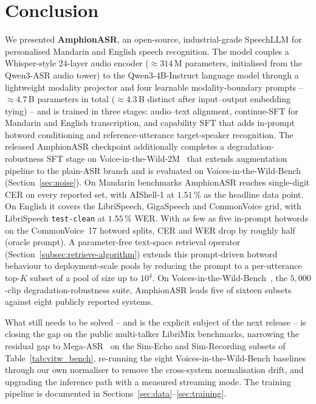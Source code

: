 \section{Conclusion}
\label{sec:conclusion}

We presented \textbf{AmphionASR}, an open-source, industrial-grade
SpeechLLM for personalised Mandarin and English speech recognition.
The model couples a Whisper-style 24-layer audio encoder
($\approx\!314$\,M parameters, initialised from the Qwen3-ASR audio
tower) to the Qwen3-4B-Instruct language model through a
lightweight modality projector and four learnable modality-boundary
prompts -- $\approx\!4.7$\,B parameters in total ($\approx\!4.3$\,B
distinct after input--output embedding tying) -- and is trained in
three stages: audio--text alignment, continue-SFT for Mandarin and
English transcription, and capability SFT that adds in-prompt
hotword conditioning and reference-utterance target-speaker
recognition. The released AmphionASR checkpoint additionally
completes a degradation-robustness SFT stage on Voice-in-the-Wild-2M~\cite{xie2026mega} that extends
augmentation pipeline to the plain-ASR branch and is evaluated on
Voices-in-the-Wild-Bench~\cite{xie2026mega}
(Section~\ref{sec:noise}). On Mandarin benchmarks AmphionASR
reaches single-digit CER on every reported set, with AIShell-1 at
$1.51$\,\% as the headline data point. On English it covers the
LibriSpeech, GigaSpeech and CommonVoice grid, with LibriSpeech
\texttt{test-clean} at $1.55$\,\% WER. With
as few as five in-prompt hotwords on the CommonVoice~17 hotword
splits, CER and WER drop by roughly half (oracle prompt).
A parameter-free text-space retrieval operator
(Section~\ref{subsec:retrieve-algorithm}) extends this prompt-driven
hotword behaviour to deployment-scale pools by reducing the
prompt to a per-utterance top-$K$ subset of a pool of size up to
$10^4$. On Voices-in-the-Wild-Bench~\cite{xie2026mega}, the
$5{,}000$-clip degradation-robustness suite, AmphionASR leads five of
sixteen subsets against eight publicly reported systems.

What still needs to be solved -- and is the explicit subject of
the next release -- is closing the gap on the public multi-talker
LibriMix benchmarks, narrowing the residual gap to
Mega-ASR~\cite{xie2026mega} on the Sim-Echo and Sim-Recording
subsets of Table~\ref{tab:vitw_bench}, re-running the eight
Voices-in-the-Wild-Bench baselines through our own normaliser to
remove the cross-system normalisation drift, and upgrading the
inference path with a measured streaming mode. The training pipeline is documented in
Sections~\ref{sec:data}--\ref{sec:training}.
